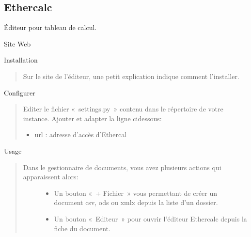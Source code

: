 \documentclass[a4paper,10pt,oneside,french]{sphinxmanual}
\begin{document}
\noindent{}


\subsection{Ethercalc}
\label{\detokenize{documents/editor:ethercalc}}
\sphinxAtStartPar
Éditeur pour tableau de calcul.

\sphinxAtStartPar
Site Web
\begin{quote}

\sphinxAtStartPar
{}
\end{quote}

\sphinxAtStartPar
Installation
\begin{quote}

\sphinxAtStartPar
Sur le site de l’éditeur, une petit explication indique comment l’installer.
\end{quote}

\sphinxAtStartPar
Configurer
\begin{quote}

\sphinxAtStartPar
Editer le fichier « settings.py » contenu dans le répertoire de votre instance.
Ajouter et adapter la ligne ci\sphinxhyphen{}dessous:
\begin{itemize}
\item {} 
\sphinxAtStartPar
url : adresse d’accès d’Ethercal

\end{itemize}
\end{quote}

\begin{sphinxVerbatim}[commandchars=\\\{\}]
   
\end{sphinxVerbatim}

\sphinxAtStartPar
Usage
\begin{quote}
\begin{description}
\item[{Dans le gestionnaire de documents, vous avez plusieurs actions qui apparaissent alors:}] \leavevmode\begin{itemize}
\item {} 
\sphinxAtStartPar
Un bouton « + Fichier » vous permettant de créer un document csv, ods ou xmlx depuis la liste d’un dossier.

\item {} 
\sphinxAtStartPar
Un bouton « Editeur » pour ouvrir l’éditeur Ethercalc depuis la fiche du document.

\end{itemize}

\end{description}
\end{quote}
\end{document}

